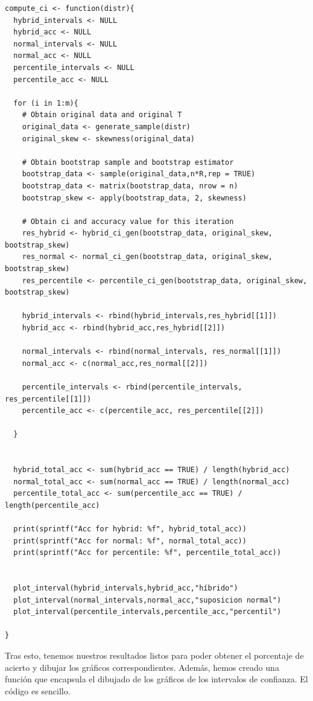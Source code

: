\documentclass[a4paper]{article}
\begin{document}
   \begin{verbatim}
compute_ci <- function(distr){
  hybrid_intervals <- NULL
  hybrid_acc <- NULL
  normal_intervals <- NULL
  normal_acc <- NULL
  percentile_intervals <- NULL
  percentile_acc <- NULL

  for (i in 1:m){
    # Obtain original data and original T
    original_data <- generate_sample(distr)
    original_skew <- skewness(original_data)

    # Obtain bootstrap sample and bootstrap estimator
    bootstrap_data <- sample(original_data,n*R,rep = TRUE)
    bootstrap_data <- matrix(bootstrap_data, nrow = n)
    bootstrap_skew <- apply(bootstrap_data, 2, skewness)

    # Obtain ci and accuracy value for this iteration
    res_hybrid <- hybrid_ci_gen(bootstrap_data, original_skew, bootstrap_skew)
    res_normal <- normal_ci_gen(bootstrap_data, original_skew, bootstrap_skew)
    res_percentile <- percentile_ci_gen(bootstrap_data, original_skew, bootstrap_skew)

    hybrid_intervals <- rbind(hybrid_intervals,res_hybrid[[1]])
    hybrid_acc <- rbind(hybrid_acc,res_hybrid[[2]])

    normal_intervals <- rbind(normal_intervals, res_normal[[1]])
    normal_acc <- c(normal_acc,res_normal[[2]])

    percentile_intervals <- rbind(percentile_intervals, res_percentile[[1]])
    percentile_acc <- c(percentile_acc, res_percentile[[2]])

  }


  hybrid_total_acc <- sum(hybrid_acc == TRUE) / length(hybrid_acc)
  normal_total_acc <- sum(normal_acc == TRUE) / length(normal_acc)
  percentile_total_acc <- sum(percentile_acc == TRUE) / length(percentile_acc)

  print(sprintf("Acc for hybrid: %f", hybrid_total_acc))
  print(sprintf("Acc for normal: %f", normal_total_acc))
  print(sprintf("Acc for percentile: %f", percentile_total_acc))


  plot_interval(hybrid_intervals,hybrid_acc,"híbrido")
  plot_interval(normal_intervals,normal_acc,"suposicion normal")
  plot_interval(percentile_intervals,percentile_acc,"percentil")

}
   \end{verbatim}

   Tras esto, tenemos nuestros resultados listos para poder obtener el porcentaje de acierto y dibujar los gráficos correspondientes. Además, hemos creado una función que encapsula el dibujado de los gráficos de los intervalos de confianza. El código es sencillo.
\end{document}
